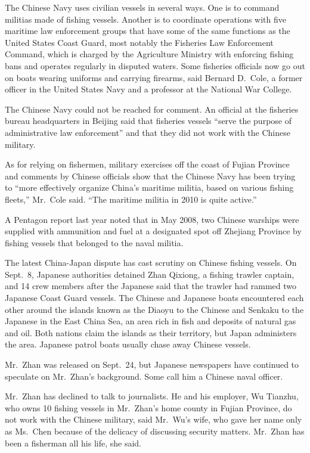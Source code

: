 ﻿\documentclass[12pt]{article}
\begin{document}
The Chinese Navy uses civilian vessels in several ways. One is to command militias made of fishing
vessels. Another is to coordinate operations with five maritime law enforcement groups that have
some of the same functions as the United States Coast Guard, most notably the Fisheries Law
Enforcement Command, which is charged by the Agriculture Ministry with enforcing fishing bans and
operates regularly in disputed waters. Some fisheries officials now go out on boats wearing uniforms
and carrying firearms, said Bernard D.~Cole, a former officer in the United States Navy and a
professor at the National War College.

The Chinese Navy could not be reached for comment. An official at the fisheries bureau headquarters
in Beijing said that fisheries vessels ``serve the purpose of administrative law enforcement'' and
that they did not work with the Chinese military.

As for relying on fishermen, military exercises off the coast of Fujian Province and comments by
Chinese officials show that the Chinese Navy has been trying to ``more effectively organize China's
maritime militia, based on various fishing fleets,'' Mr.~Cole said. ``The maritime militia in 2010
is quite active.''

A Pentagon report last year noted that in May 2008, two Chinese warships were supplied with
ammunition and fuel at a designated spot off Zhejiang Province by fishing vessels that belonged to
the naval militia.

The latest China-Japan dispute has cast scrutiny on Chinese fishing vessels. On Sept.~8, Japanese
authorities detained Zhan Qixiong, a fishing trawler captain, and 14 crew members after the Japanese
said that the trawler had rammed two Japanese Coast Guard vessels. The Chinese and Japanese boats
encountered each other around the islands known as the Diaoyu to the Chinese and Senkaku to the
Japanese in the East China Sea, an area rich in fish and deposits of natural gas and oil. Both
nations claim the islands as their territory, but Japan administers the area. Japanese patrol boats
usually chase away Chinese vessels.

Mr.~Zhan was released on Sept.~24, but Japanese newspapers have continued to speculate on Mr.~Zhan's
background. Some call him a Chinese naval officer.

Mr.~Zhan has declined to talk to journalists. He and his employer, Wu Tianzhu, who owns 10 fishing
vessels in Mr.~Zhan's home county in Fujian Province, do not work with the Chinese military, said
Mr.~Wu's wife, who gave her name only as Ms.~Chen because of the delicacy of discussing security
matters. Mr.~Zhan has been a fisherman all his life, she said.
\end{document}
